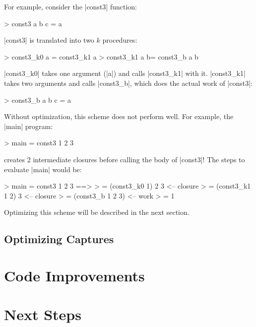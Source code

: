 \documentclass[11pt]{article}
\begin{document}
For example, consider the |const3| function:

> const3 a b c = a

|const3| is translated into two $k$ procedures:

> const3_k0 a = const3_k1 a
> const3_k1 a b= const3_b a b

|const3_k0| takes one argument (|a|) and calls |const3_k1| with it. |const3_k1| takes
two arguments and calls |const3_b|, which does the actual work of |const3|:

> const3_b a b c = a

Without optimization, this scheme does not perform well. For example, the |main| program:

> main = const3 1 2 3 

creates 2 intermediate closures before calling the body of |const3|!
The steps to evaluate |main| would be:

> main = const3 1 2 3 ==>
>      = (const3_k0 1) 2 3 <-- closure
>      = (const3_k1 1 2) 3 <-- closure
>      = (const3_b 1 2 3)  <-- work
>      = 1

Optimizing this scheme will be described in the next section.

\subsection*{Optimizing Captures}



\section*{Code Improvements}

\section*{Next Steps}
\end{document}
